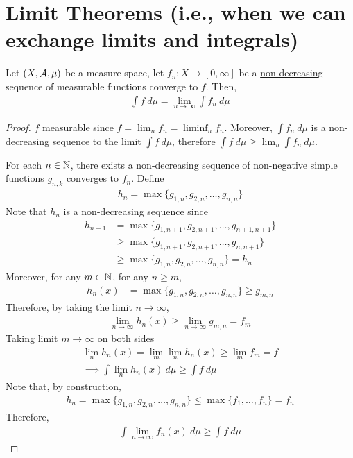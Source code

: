 \documentclass[11pt]{article}
\begin{document}
	\section{Limit Theorems (i.e., when we can exchange limits and integrals)}
	\begin{theorem}
		Let $(X, \mathcal{{A}}, \mu)$ be a measure space, let $f_n: X \to [0, \infty]$ be a \ul{non-decreasing} sequence of measurable functions converge to $f$. Then,
		\begin{align}
			\int f\ d\mu = \lim_{n\to\infty} \int f_n\ d\mu
		\end{align}
		\begin{proof}
			$f$ measurable since $f = \lim_n f_n = \liminf_n f_n$. Moreover, $\int f_n\ d\mu$ is a non-decreasing sequence to the limit $\int f\ d\mu$, therefore $\int f\ d\mu \geq \lim_n \int f_n\ d\mu$.

			For each $n \in \mathbb{N}$, there exists a non-decreasing sequence of non-negative simple functions $g_{n,k}$ converges to $f_n$. Define
			\begin{align}
				h_n = \max\{g_{1,n}, g_{2,n}, \dots, g_{n,n}\}
			\end{align}
			Note that $h_n$ is a non-decreasing sequence since
			\begin{align}
				h_{n+1} &= \max\{g_{1,n+1}, g_{2,n+1}, \dots, g_{n+1,n+1}\} \\
				&\geq \max\{g_{1,n+1}, g_{2,n+1}, \dots, g_{n,n+1}\} \\
				&\geq \max\{g_{1,n}, g_{2,n}, \dots, g_{n,n}\} = h_n
			\end{align}
			Moreover, for any $m \in \mathbb{N}$, for any $n \geq m$,
			\begin{align}
				h_n(x) &=  \max\{g_{1,n}, g_{2,n}, \dots, g_{n,n}\}
				\geq g_{m,n}
			\end{align}
			Therefore, by taking the limit $n \to \infty$,
			\begin{align}
				\lim_{n \to \infty} h_n(x) \geq \lim_{n \to \infty} g_{m, n} = f_m
			\end{align}
			Taking limit $m \to \infty$ on both sides
			\begin{align}
				\lim_n h_n(x) = \lim_m \lim_n h_n(x) \geq \lim_m f_m = f \\
				\implies \int \lim_n h_n(x)\ d\mu \geq \int f\ d\mu
			\end{align}
			Note that, by construction,
			\begin{align}
				h_n =  \max\{g_{1,n}, g_{2,n}, \dots, g_{n,n}\} \leq \max\{f_1, \dots, f_n\} = f_n
			\end{align}
			Therefore,
			\begin{align}
				\int \lim_{n\to\infty} f_n(x)\ d\mu \geq \int f\ d\mu
			\end{align}
		\end{proof}
	\end{theorem}
	
\end{document}
